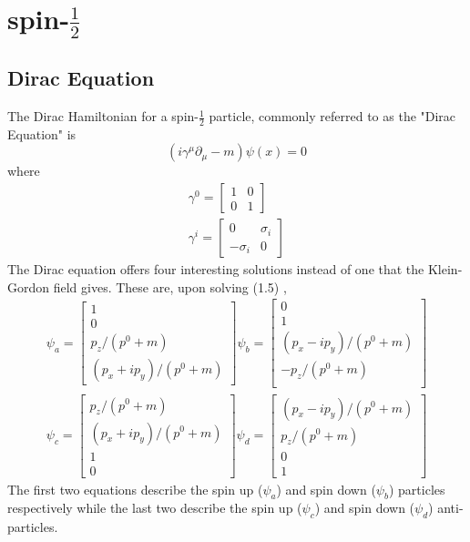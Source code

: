 \section{spin-$ \frac{1}{2}$}
\subsection{Dirac Equation}
The Dirac Hamiltonian for a spin-$ \frac{1}{2} $ particle, commonly referred to as the "Dirac Equation" is \cite{lahiri04}
\begin{equation}
(i\gamma^{\mu}\partial_\mu-m)\psi(x)=0
\end{equation}
where
\begin{eqnarray}
\gamma^0=\begin{bmatrix}
1 & 0\\
0 & 1
\end{bmatrix}\\
\gamma^i=\begin{bmatrix}
0 &  \sigma_i\\
-\sigma_i & 0
\end{bmatrix}
\end{eqnarray}
The Dirac equation offers four interesting solutions instead of one that the Klein-Gordon field gives. These are, upon solving (1.5) \cite{griffiths08},
\begin{eqnarray}
\psi_a=\begin{bmatrix}
1\\
0\\
p_z/(p^0+m)\\
(p_x+ip_y)/(p^0+m)
\end{bmatrix}
\psi_b=\begin{bmatrix}
0\\
1\\
(p_x-ip_y)/(p^0+m)\\
-p_z/(p^0+m)\\
\end{bmatrix}\\
\psi_c=\begin{bmatrix}
p_z/(p^0+m)\\
(p_x+ip_y)/(p^0+m)\\
1\\
0
\end{bmatrix}
\psi_d=\begin{bmatrix}
(p_x-ip_y)/(p^0+m)\\
p_z/(p^0+m)\\
0\\
1
\end{bmatrix}
\end{eqnarray}
The first two equations describe the spin up ($\psi_a$) and spin down ($\psi_b$) particles respectively while the last two describe the spin up ($\psi_c$) and spin down ($\psi_d$) anti-particles.
